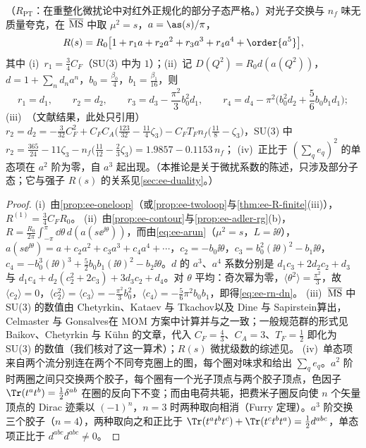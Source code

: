 \begin{corollary}\label{cor:ee-R-alphas}
（$R_{\mathrm{PT}}$：在重整化微扰论中对红外正规化的部分子态严格。）对光子交换与 $n_f$ 味无质量夸克，在 $\overline{\rm MS}$ 中取 $\mu^2=s$，$a=\as(s)/\pi$，
\begin{equation}\label{eq:ee-Rexp}
R(s)=R_0\big[1+r_1a+r_2a^2+r_3a^3+r_4a^4+\order{a^5}\big],
\end{equation}
其中 (i)~$r_1=\frac34C_F$（SU(3) 中为 $1$）；(ii)~记 $D(Q^2)=R_0d(a(Q^2))$，$d=1+\sum_nd_na^n$，$b_0=\frac{\beta_0}4$，$b_1=\frac{\beta_1}{16}$，则
\begin{equation}\label{eq:ee-rn-dn}
r_1=d_1,\qquad r_2=d_2,\qquad r_3=d_3-\frac{\pi^2}3b_0^2d_1,\qquad r_4=d_4-\pi^2\Big(b_0^2d_2+\frac56b_0b_1d_1\Big);
\end{equation}
(iii)~（文献结果，此处只引用）$r_2=d_2=-\frac3{32}C_F^2+C_FC_A\big(\frac{123}{32}-\frac{11}4\zeta_3\big)-C_FT_Fn_f\big(\frac{11}8-\zeta_3\big)$，SU(3) 中 $r_2=\frac{365}{24}-11\zeta_3-n_f\big(\frac{11}{12}-\frac23\zeta_3\big)=1.9857-0.1153\,n_f$；%
(iv)~正比于 $(\sum_qe_q)^2$ 的单态项在 $a^2$ 阶为零，自 $a^3$ 起出现。（本推论是关于微扰系数的陈述，只涉及部分子态；它与强子 $R(s)$ 的关系见\cref{sec:ee-duality}。）
\end{corollary}
\begin{proof}
(i)~由\cref{prop:ee-oneloop}（或\cref{prop:ee-twoloop}与\cref{thm:ee-R-finite}(iii)），$R^{(1)}=\frac34C_FR_0$。
(ii)~由\cref{prop:ee-contour}与\cref{prop:ee-adler-rg}(b)，$R=\frac{R_0}{2\pi}\int_{-\pi}^{\pi}\dd\theta\,d(a(s\ee^{\ii\theta}))$，而由\cref{eq:ee-arun}（$\mu^2=s$，$L=\ii\theta$），$a(s\ee^{\ii\theta})=a+c_2a^2+c_3a^3+c_4a^4+\cdots$，$c_2=-b_0\ii\theta$，$c_3=b_0^2(\ii\theta)^2-b_1\ii\theta$，$c_4=-b_0^3(\ii\theta)^3+\frac52b_0b_1(\ii\theta)^2-b_2\ii\theta$。$d$ 的 $a^3$、$a^4$ 系数分别是 $d_1c_3+2d_2c_2+d_3$ 与 $d_1c_4+d_2(c_2^2+2c_3)+3d_3c_2+d_4$。对 $\theta$ 平均：奇次幂为零，$\langle\theta^2\rangle=\frac{\pi^2}3$，故 $\langle c_2\rangle=0$，$\langle c_2^2\rangle=\langle c_3\rangle=-\frac{\pi^2}3b_0^2$，$\langle c_4\rangle=-\frac56\pi^2b_0b_1$，即得\cref{eq:ee-rn-dn}。
(iii)~$\overline{\rm MS}$ 中 SU(3) 的数值由 Chetyrkin、Kataev 与 Tkachov\cite{ChetyrkinKataevTkachov1979}以及 Dine 与 Sapirstein\cite{DineSapirstein1979}算出，Celmaster 与 Gonsalves\cite{CelmasterGonsalves1980a}在 MOM 方案中计算并与之一致；一般规范群的形式见 Baikov、Chetyrkin 与 Kühn 的文章\cite{Baikov:2010je}，代入 $C_F=\frac43$、$C_A=3$、$T_F=\frac12$ 即化为 SU(3) 的数值（我们核对了这一算术）；$R(s)$ 微扰级数的综述见\cite{ChetyrkinKuhnKwiatkowski1996}。
(iv)~单态项来自两个流分别连在两个不同夸克圈上的图，每个圈对味求和给出 $\sum_qe_q$。$a^2$ 阶时两圈之间只交换两个胶子，每个圈有一个光子顶点与两个胶子顶点，色因子 $\Tr(t^at^b)=\frac12\delta^{ab}$ 在圈的反向下不变；而由电荷共轭，把费米子圈反向使 $n$ 个矢量顶点的 Dirac 迹乘以 $(-1)^n$，$n=3$ 时两种取向相消（Furry 定理\cite{Furry:1937zz}）。$a^3$ 阶交换三个胶子（$n=4$），两种取向之和正比于 $\Tr(t^at^bt^c)+\Tr(t^ct^bt^a)=\frac12d^{abc}$，单态项正比于 $d^{abc}d^{abc}\ne0$。
\end{proof}
